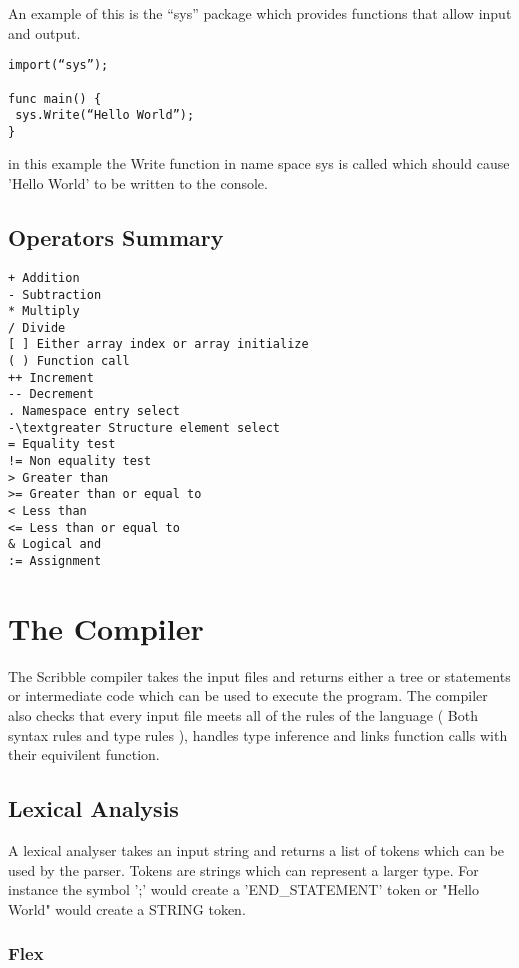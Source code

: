 \documentclass[]{final_report}
\begin{document}
An example of this is the “sys” package which provides functions that allow input and output.

\begin{verbatim}
import(“sys”);

func main() {
 sys.Write(“Hello World”);
}
\end{verbatim}

in this example the Write function in name space sys is called which should cause 'Hello World' to be written to the console.

\section{Operators Summary}

\begin {verbatim}
+ Addition
- Subtraction
* Multiply
/ Divide
[ ] Either array index or array initialize
( ) Function call
++ Increment
-- Decrement
. Namespace entry select
-\textgreater Structure element select
= Equality test
!= Non equality test
> Greater than
>= Greater than or equal to
< Less than
<= Less than or equal to
& Logical and 
:= Assignment
\end{verbatim}

\chapter{The Compiler}

The Scribble compiler takes the input files and returns either a tree or statements or intermediate code which can be used to execute the program. The compiler also checks that every input file meets all of the rules of the language ( Both syntax rules and type rules ), handles type inference and links function calls with their equivilent function.

\section{Lexical Analysis}

A lexical analyser takes an input string and returns a list of tokens which can be used by the parser. Tokens are strings which can represent a larger type. For instance the symbol ';' would create a 'END\_STATEMENT' token or "Hello World" would create a STRING token.

\subsection{Flex}
\end{document}
